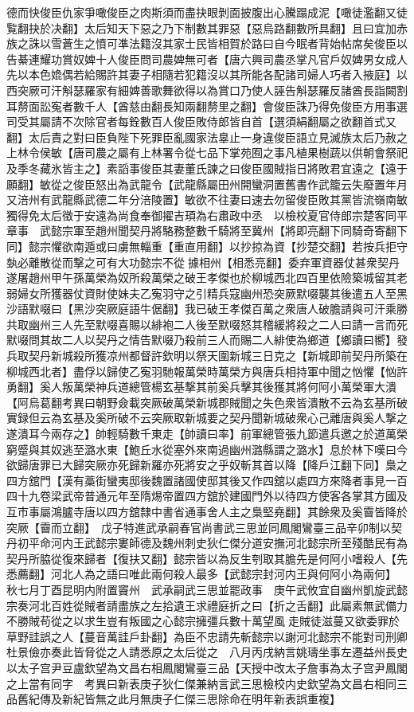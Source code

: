 德而快俊臣仇家爭噉俊臣之肉斯須而盡抉眼剝面披腹出心騰蹋成泥【噉徒濫翻又徒覧翻抉於决翻】太后知天下惡之乃下制數其罪惡【惡烏路翻數所具翻】且曰宜加赤族之誅以雪蒼生之憤可凖法籍沒其家士民皆相賀於路曰自今眠者背始帖席矣俊臣以告綦連耀功賞奴婢十人俊臣問司農婢無可者【唐六興司農丞掌凡官戶奴婢男女成人先以本色嫓偶若給賜許其妻子相隨若犯籍沒以其所能各配諸司婦人巧者入掖庭】以西突厥可汗斛瑟羅家有細婢善歌舞欲得以為賞口乃使人誣告斛瑟羅反諸酋長詣闕割耳剺面訟寃者數千人【酋慈由翻長知兩翻剺里之翻】會俊臣誅乃得免俊臣方用事選司受其屬請不次除官者每銓數百人俊臣敗侍郎皆自首【選須絹翻屬之欲翻首式又翻】太后責之對曰臣負陛下死罪臣亂國家法辠止一身違俊臣語立見滅族太后乃赦之上林令侯敏【唐司農之屬有上林署令從七品下掌苑囿之事凡植果樹蔬以供朝會祭祀及季冬藏氷皆主之】素謟事俊臣其妻董氏諫之曰俊臣國賊指日將敗君宜遠之【遠于願翻】敏從之俊臣怒出為武龍令【武龍縣屬田州開蠻洞置舊書作武籠云失廢置年月又涪州有武龍縣武德二年分涪陵置】敏欲不往妻曰速去勿留俊臣敗其黨皆流嶺南敏獨得免太后徵于安遠為尚食奉御擢吉頊為右肅政中丞　以檢校夏官侍郎宗楚客同平章事　武懿宗軍至趙州聞契丹將駱務整數千騎將至冀州【將即亮翻下同騎奇寄翻下同】懿宗懼欲南遁或曰虜無輜重【重直用翻】以抄掠為資【抄楚交翻】若按兵拒守埶必離散從而撃之可有大功懿宗不從據相州【相悉亮翻】委弃軍資器仗甚衆契丹遂屠趙州甲午孫萬榮為奴所殺萬榮之破王孝傑也於柳城西北四百里依險築城留其老弱婦女所獲器仗資財使妹夫乙寃羽守之引精兵寇幽州恐突厥默啜襲其後遣五人至黑沙語默啜曰【黑沙突厥庭語牛倨翻】我已破王孝傑百萬之衆唐人破膽請與可汗乘勝共取幽州三人先至默啜喜賜以緋袍二人後至默啜怒其稽緩將殺之二人曰請一言而死默啜問其故二人以契丹之情告默啜乃殺前三人而賜二人緋使為鄉道【鄉讀曰嚮】發兵取契丹新城殺所獲凉州都督許欽明以祭天圍新城三日克之【新城即前契丹所築在柳城西北者】盡俘以歸使乙寃羽馳報萬榮時萬榮方與唐兵相持軍中聞之忷懼【忷許勇翻】奚人叛萬榮神兵道總管楊玄基撃其前奚兵擊其後獲其將何阿小萬榮軍大潰【阿烏葛翻考異曰朝野僉載突厥破萬榮新城郡賊聞之失色衆皆潰散不云為玄基所破實録但云為玄基及奚所破不云突厥取新城要之契丹聞新城破衆心己離唐與奚人撃之遂潰耳今兩存之】帥輕騎數千東走【帥讀曰率】前軍總管張九節遣兵邀之於道萬榮窮蹙與其奴逃至潞水東【鮑丘水從塞外來南過幽州潞縣謂之潞水】息於林下嘆曰今欲歸唐罪已大歸突厥亦死歸新羅亦死將安之乎奴斬其首以降【降戶江翻下同】梟之四方舘門【漢有藁街蠻夷邸後魏置諸國使邸其後又作四舘以處四方來降者事見一百四十九卷梁武帝普通元年至隋焬帝置四方舘於建國門外以待四方使客各掌其方國及互市事屬鴻臚寺唐以四方舘隸中書省通事舍人主之梟堅堯翻】其餘衆及奚霫皆降於突厥【霫而立翻】　戊子特進武承嗣春官尚書武三思並同鳳閣鸞臺三品辛卯制以契丹初平命河内王武懿宗婁師德及魏州刺史狄仁傑分道安撫河北懿宗所至殘酷民有為契丹所脇從復來歸者【復扶又翻】懿宗皆以為反生刳取其膽先是何阿小嗜殺人【先悉薦翻】河北人為之語曰唯此兩何殺人最多【武懿宗封河内王與何阿小為兩何】　秋七月丁酉昆明内附置竇州　武承嗣武三思並罷政事　庚午武攸宜自幽州凱旋武懿宗奏河北百姓從賊者請盡族之左拾遺王求禮庭折之曰【折之舌翻】此屬素無武備力不勝賊苟從之以求生豈有叛國之心懿宗擁彊兵數十萬望風走賊徒滋蔓又欲委罪於草野詿誤之人【蔓音萬詿戶卦翻】為臣不忠請先斬懿宗以謝河北懿宗不能對司刑卿杜景儉亦奏此皆脅從之人請悉原之太后從之　八月丙戌納言姚璹坐事左遷益州長史以太子宫尹豆盧欽望為文昌右相鳳閣鸞臺三品【天授中改太子詹事為太子宫尹鳳閣之上當有同字　考異曰新表庚子狄仁傑兼納言武三思檢校内史欽望為文昌右相同三品舊紀傳及新紀皆無之此月無庚子仁傑三思除命在明年新表誤重複】　